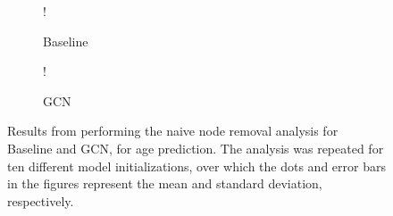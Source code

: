 \begin{figure}[H]
    \centering
        \begin{subfigure}{.5\textwidth}
            \centering
            \begin{center}
                \resizebox {1.0\linewidth} {!} {
                    
                }
            \end{center}
            \caption{Baseline}
            \label{fig:naive_age_baseline}
        \end{subfigure}%
        \begin{subfigure}{.5\textwidth}
            \centering
            \begin{center}
                \resizebox {1.0\linewidth} {!} {
                    
                }
            \end{center}
            \caption{GCN}
            \label{fig:naive_age_gcn}
        \end{subfigure}
    \caption{Results from performing the naive node removal analysis for Baseline and GCN, for age prediction. The analysis was repeated for ten different model initializations, over which the dots and error bars in the figures represent the mean and standard deviation, respectively.}
    \label{fig:naive_age}
\end{figure}




